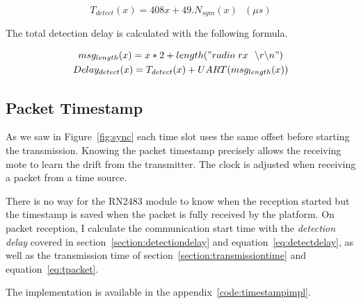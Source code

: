 \begin{equation}
  \label{eq:detectcomp}
  T_{detect}(x) = 408x + 49 . N_{sym}(x) \ \ \ (\mu s)
\end{equation}

The total detection delay is calculated with the following formula.

\begin{gather}
  msg_{length}(x) = x * 2 + length("radio~rx~~\backslash r \backslash n") \\
  \label{eq:detectdelay}
  Delay_{detect}(x) = T_{detect}(x) + UART(msg_{length}(x))
\end{gather}

\subsection{Packet Timestamp}

As we saw in Figure~\ref{fig:sync} each time slot uses the same offset before 
starting the transmission.
Knowing the packet timestamp precisely allows the receiving mote to learn the
drift from the transmitter. 
The clock is adjusted when receiving a packet from a time source.

There is no way for the RN2483 module to know when the reception started but
the timestamp is saved when the packet is fully received by the platform.
On packet reception, I calculate the communication start time with the 
\emph{detection delay} covered in section~\ref{section:detectiondelay} and
equation~\ref{eq:detectdelay}, as well as the transmission time of
section~\ref{section:transmissiontime} and equation~\ref{eq:tpacket}.

The implementation is available in the appendix~\ref{code:timestampimpl}.




